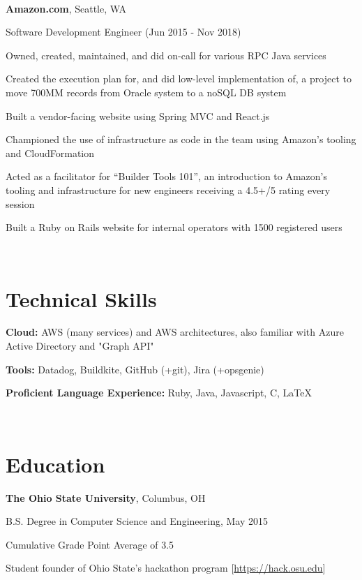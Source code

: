 \documentclass[letterpaper]{resume}
\begin{document}
~

\textbf{Amazon.com}, Seattle, WA

Software Development Engineer (Jun 2015 - Nov 2018)

\begin{compactitem}
\item Owned, created, maintained, and did on-call for various RPC Java services
\item Created the execution plan for, and did low-level implementation of, a
    project to move 700MM records from Oracle system to a noSQL DB
    system
\item Built a vendor-facing website using Spring MVC and React.js
\item Championed the use of infrastructure as code in the team using
    Amazon's tooling and CloudFormation
\item Acted as a facilitator for ``Builder Tools 101'', an introduction to
    Amazon's tooling and infrastructure for new engineers receiving a 4.5+/5 rating every session
\item Built a Ruby on Rails website for internal operators with 1500 registered users
\end{compactitem}

~


\section{Technical Skills}

\begin{compactitem}
\item
	\textbf{Cloud:}
    AWS (many services) and AWS architectures, also familiar with Azure Active
    Directory and "Graph API"

\item
    \textbf{Tools:}
    Datadog, Buildkite, GitHub (+git), Jira (+opsgenie)

\item
	\textbf{Proficient Language Experience:}
    Ruby, Java, Javascript, C, \LaTeX

\end{compactitem}

~

\section{Education}
\textbf{The Ohio State University}, Columbus, OH
\begin{compactitem}
\item B.S. Degree in Computer Science and Engineering, May 2015
\item Cumulative Grade Point Average of 3.5
\item Student founder of Ohio State's hackathon program [\url{https://hack.osu.edu}]
\end{compactitem}
\end{document}
